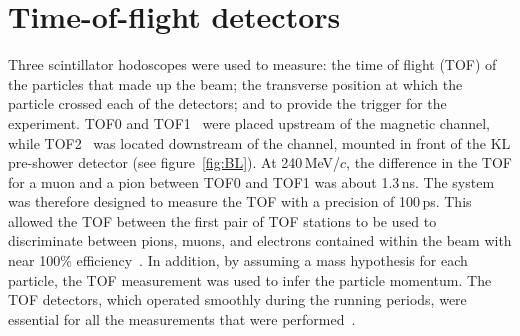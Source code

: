 \graphicspath{{02-TOF/Figures/}}

\newcommand{\Tzero}{\ensuremath{T0}}
\newcommand{\Gauss}{\ensuremath{\text{G}}}
\newcommand{\Dt}{\ensuremath{\Delta t}}
\newcommand{\us}{\ensuremath{\mu\text{s}}}

\section{Time-of-flight detectors}
\label{Sect:TOF}

Three scintillator hodoscopes were used to measure: the time of flight
(TOF) of the particles that made up the beam; the transverse position
at which the particle crossed each of the detectors; and to provide
the trigger for the experiment. 
TOF0 and TOF1~\cite{NOTE145,NOTE241,2010NIMPA.615...14B} were
placed upstream of the magnetic channel, while TOF2~\cite{NOTE286}
was located downstream of the channel, mounted in front of the KL
pre-shower detector (see figure~\ref{fig:BL}).
At 240\,MeV/$c$, the difference in the TOF for a muon and a
pion between TOF0 and TOF1 was about 1.3\,ns.
The system was therefore designed to measure the TOF with a
precision of 100\,ps. 
This allowed the TOF between the first pair of TOF stations 
to be used to discriminate between pions, muons, and electrons
contained within the beam with near 100\% efficiency~\cite{2016JInst..11P3001A}.
In addition, by assuming a mass hypothesis for each particle, the
TOF measurement was used to infer the particle
momentum.
The TOF detectors, which operated smoothly during the running periods,
were essential for all the measurements that were
performed~\cite{Bogomilov:2012sr,Adams:2013lba,2015JInst..10P2012A,2016JInst..11P3001A,Adams:2018qhj,Bogomilov:2019kfj}.

